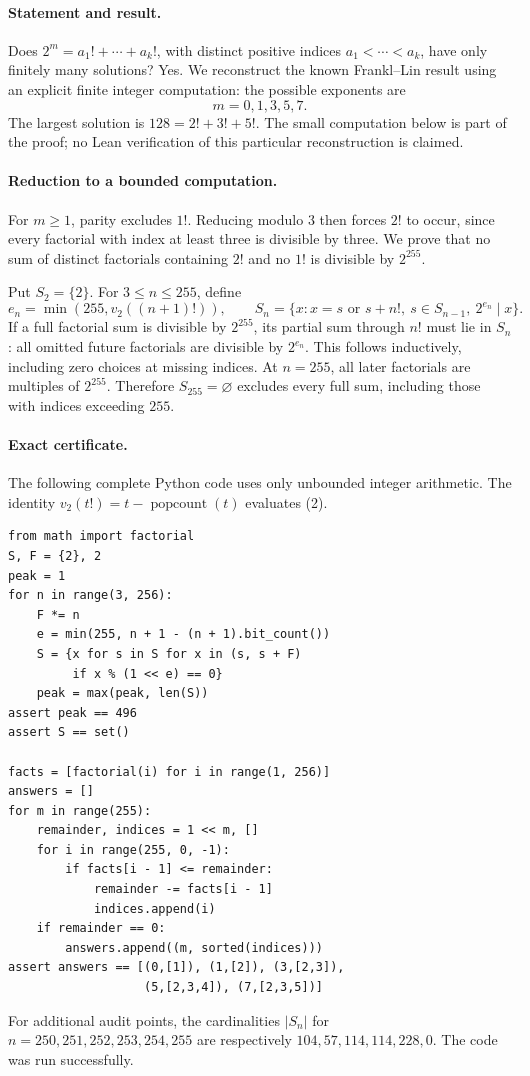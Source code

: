 \paragraph{Statement and result.}
Does \(2^m=a_1!+\cdots+a_k!\), with distinct positive indices
\(a_1<\cdots<a_k\), have only finitely many solutions?
Yes. We reconstruct the known Frankl--Lin result using an explicit finite
integer computation: the possible exponents are
\[
 m=0,1,3,5,7.
 \tag{1}
\]
The largest solution is \(128=2!+3!+5!\).
The small computation below is part of the proof; no Lean verification
of this particular reconstruction is claimed.

\paragraph{Reduction to a bounded computation.}
For \(m\geq1\), parity excludes \(1!\). Reducing modulo \(3\)
then forces \(2!\) to occur, since every factorial with index at least
three is divisible by three. We prove that no sum of distinct factorials
containing \(2!\) and no \(1!\) is divisible by \(2^{255}\).

Put \(S_2=\{2\}\). For \(3\leq n\leq255\), define
\[
 e_n=\min(255,v_2((n+1)!)),\qquad
 S_n=\{x:x=s\text{ or }s+n!,\ s\in S_{n-1},\ 2^{e_n}\mid x\}.
 \tag{2}
\]
If a full factorial sum is divisible by \(2^{255}\), its partial
sum through \(n!\) must lie in \(S_n\): all omitted future factorials
are divisible by \(2^{e_n}\). This follows inductively, including
zero choices at missing indices. At \(n=255\), all later factorials
are multiples of \(2^{255}\). Therefore \(S_{255}=\varnothing\)
excludes every full sum, including those with indices exceeding \(255\).

\paragraph{Exact certificate.}
The following complete Python code uses only unbounded integer arithmetic.
The identity \(v_2(t!)=t-\operatorname{popcount}(t)\) evaluates (2).
\begin{verbatim}
from math import factorial
S, F = {2}, 2
peak = 1
for n in range(3, 256):
    F *= n
    e = min(255, n + 1 - (n + 1).bit_count())
    S = {x for s in S for x in (s, s + F)
         if x % (1 << e) == 0}
    peak = max(peak, len(S))
assert peak == 496
assert S == set()

facts = [factorial(i) for i in range(1, 256)]
answers = []
for m in range(255):
    remainder, indices = 1 << m, []
    for i in range(255, 0, -1):
        if facts[i - 1] <= remainder:
            remainder -= facts[i - 1]
            indices.append(i)
    if remainder == 0:
        answers.append((m, sorted(indices)))
assert answers == [(0,[1]), (1,[2]), (3,[2,3]),
                   (5,[2,3,4]), (7,[2,3,5])]
\end{verbatim}
For additional audit points, the cardinalities \(|S_n|\) for
\(n=250,251,252,253,254,255\) are respectively
\(104,57,114,114,228,0\). The code was run successfully.

